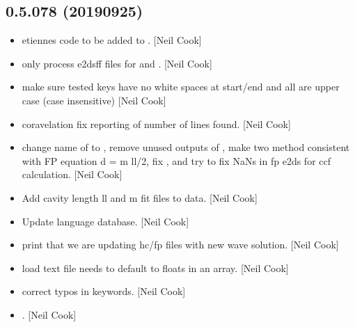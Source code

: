 \documentclass[a4paper,10pt,english]{report}
\begin{document}
\subsection{0.5.078 (2019\sphinxhyphen{}09\sphinxhyphen{}25)}
\label{\detokenize{misc/changelog:id83}}\begin{itemize}
\item {} 
 \sphinxhyphen{} etiennes code to be added to .
{[}Neil Cook{]}

\item {} 
 \sphinxhyphen{} only process e2dsff files for  and
. {[}Neil Cook{]}

\item {} 
 \sphinxhyphen{} make sure tested keys have no white spaces at
start/end and all are upper case (case insensitive) {[}Neil Cook{]}

\item {} 
 \sphinxhyphen{} coravelation \sphinxhyphen{} fix reporting of number
of lines found. {[}Neil Cook{]}

\item {} 
 \sphinxhyphen{} change name of  to
, remove unused outputs of ,
make two method consistent with FP equation d = m \sphinxtitleref{*} ll/2, fix
, and try to fix NaNs in fp e2ds for ccf
calculation. {[}Neil Cook{]}

\item {} 
Add cavity length ll and m fit files to data. {[}Neil Cook{]}

\item {} 
Update language database. {[}Neil Cook{]}

\item {} 
 \sphinxhyphen{} print that we are updating hc/fp
files with new wave solution. {[}Neil Cook{]}

\item {} 
 \sphinxhyphen{} load text file needs to default to floats in an
array. {[}Neil Cook{]}

\item {} 
 \sphinxhyphen{} correct typos in
keywords. {[}Neil Cook{]}

\item {} 
 \sphinxhyphen{} .
{[}Neil Cook{]}

\end{itemize}
\end{document}
